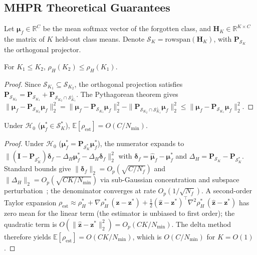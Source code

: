 \documentclass[smallextended]{svjour3}       %
\begin{document}
\subsection{MHPR Theoretical Guarantees}
\label{app:mhpr}

Let $\boldsymbol{\mu}_f \in \mathbb{R}^C$ be the mean softmax vector of the forgotten class, and $\mathbf{H}_K \in \mathbb{R}^{K\times C}$ the matrix of $K$ held-out class means. Denote $\mathcal{S}_K = \mathrm{rowspan}(\mathbf{H}_K)$, with $\mathbf{P}_{\mathcal{S}_K}$ the orthogonal projector.

\begin{proposition}
\label{prop:mhpr_monotone}
For $K_1 \le K_2$, $\rho_H(K_2) \le \rho_H(K_1)$.
\end{proposition}
\begin{proof}
Since $\mathcal{S}_{K_1} \subseteq \mathcal{S}_{K_2}$, the orthogonal projection satisfies $\mathbf{P}_{\mathcal{S}_{K_2}} = \mathbf{P}_{\mathcal{S}_{K_1}} + \mathbf{P}_{\mathcal{S}_{K_2} \cap \mathcal{S}_{K_1}^\perp}$. The Pythagorean theorem gives $\|\boldsymbol{\mu}_f - \mathbf{P}_{\mathcal{S}_{K_2}}\boldsymbol{\mu}_f\|_2^2 = \|\boldsymbol{\mu}_f - \mathbf{P}_{\mathcal{S}_{K_1}}\boldsymbol{\mu}_f\|_2^2 - \|\mathbf{P}_{\mathcal{S}_{K_2} \cap \mathcal{S}_{K_1}^\perp}\boldsymbol{\mu}_f\|_2^2 \le \|\boldsymbol{\mu}_f - \mathbf{P}_{\mathcal{S}_{K_1}}\boldsymbol{\mu}_f\|_2^2$.
\end{proof}

\begin{proposition}
\label{prop:mhpr_bias}
Under $\mathcal{H}_0$ ($\boldsymbol{\mu}_f^* \in \mathcal{S}_K^*$), $\mathbb{E}[\rho_{\mathrm{est}}] = O(C/N_{\min})$.
\end{proposition}
\begin{proof}
Under $\mathcal{H}_0$ ($\boldsymbol{\mu}_f^*=\mathbf{P}_{\mathcal{S}_K^*}\boldsymbol{\mu}_f^*$), the numerator expands to $\|(\mathbf{I}-\mathbf{P}_{\mathcal{S}_K^*})\boldsymbol{\delta}_f-\Delta_H\boldsymbol{\mu}_f^*-\Delta_H\boldsymbol{\delta}_f\|_2^2$ with $\boldsymbol{\delta}_f=\hat{\boldsymbol{\mu}}_f-\boldsymbol{\mu}_f^*$ and $\Delta_H=\mathbf{P}_{\mathcal{S}_K}-\mathbf{P}_{\mathcal{S}_K^*}$. Standard bounds give $\|\boldsymbol{\delta}_f\|_2=O_p(\sqrt{C/N_f})$ and $\|\Delta_H\|_2=O_p(\sqrt{CK/N_{\min}})$ via sub-Gaussian concentration and subspace perturbation~\cite{stewart1990matrix}; the denominator converges at rate $O_p(1/\sqrt{N_f})$. A second-order Taylor expansion $\rho_{\mathrm{est}}\approx\rho_H^*+\nabla\rho_H^*\,(\hat{\mathbf{z}}-\mathbf{z}^*)+\frac12(\hat{\mathbf{z}}-\mathbf{z}^*)^\top\nabla^2\rho_H^*\,(\hat{\mathbf{z}}-\mathbf{z}^*)$ has zero mean for the linear term (the estimator is unbiased to first order); the quadratic term is $O(\|\hat{\mathbf{z}}-\mathbf{z}^*\|_2^2)=O_p(CK/N_{\min})$. The delta method therefore yields $\mathbb{E}[\rho_{\mathrm{est}}]=O(CK/N_{\min})$, which is $O(C/N_{\min})$ for $K=O(1)$.
\end{proof}
\end{document}
